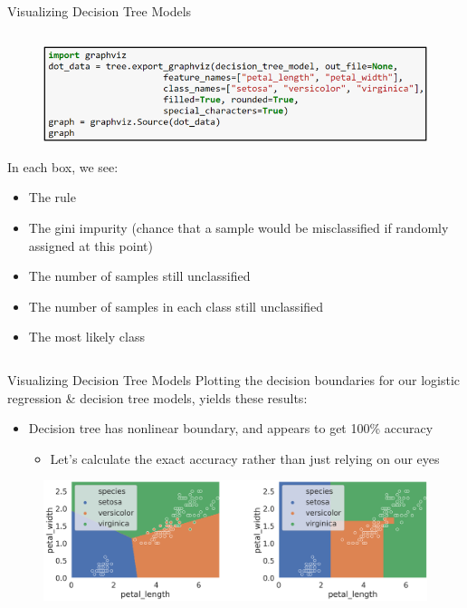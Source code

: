 \documentclass[aspectratio=169]{../latex_main/tntbeamer}  %
\begin{document}
\begin{frame}{Visualizing Decision Tree Models }
\begin{columns}
	        
	        \begin{column}{.6\textwidth}
	                \begin{figure}
	                    \includegraphics[scale=.55]{Bild24}
	                \end{figure}
	                In each box, we see:
	                \begin{itemize}
	                    \item The rule
	                    \item The gini impurity (chance that a sample would be misclassified if randomly assigned at this point)
	                    \item The number of samples still unclassified
	                    \item The number of samples in each class still unclassified
	                    \item The most likely class
	                \end{itemize}
	        \end{column}
	    \end{columns}
	\end{frame}
	
	
	\begin{frame}{Visualizing Decision Tree Models}
	    Plotting the decision boundaries for our logistic regression & decision tree models, yields these results:
	    \begin{itemize}
	        \item Decision tree has nonlinear boundary, and appears to get 100\% accuracy
	        \begin{itemize}
	            \item Let’s calculate the exact accuracy rather than just relying on our eyes
	        \end{itemize}
	    \end{itemize}
	    \begin{figure}
	        \centering
	        \includegraphics[scale=.45]{Bild26}
	    \end{figure}
	\end{frame}
	
\end{document}
